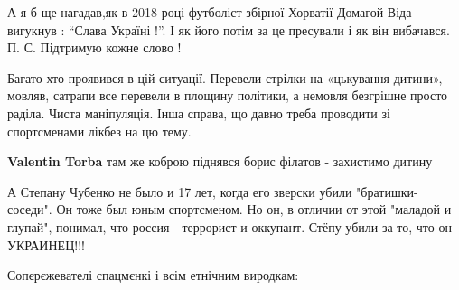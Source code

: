 \begin{itemize}
 

А я б ще нагадав,як в 2018 році футболіст збірної Хорватії Домагой Віда
вигукнув : \enquote{Слава Україні !}. І як його потім за це пресували і як він
вибачався. П. С. Підтримую кожне слово !


 

Багато хто проявився в цій ситуації. Перевели стрілки на «цькування дитини»,
мовляв, сатрапи все перевели в площину політики, а немовля безгрішне просто
раділа. Чиста маніпуляція. Інша справа, що давно треба проводити зі
спортсменами лікбез на цю тему.

\begin{itemize}
 
\textbf{Valentin Torba} там же коброю піднявся борис філатов - захистимо дитину
\end{itemize}

 

А Степану Чубенко не было и 17 лет, когда его зверски убили "братишки-соседи".
Он тоже был юным спортсменом. Но он, в отличии от этой "маладой и глупай",
понимал, что россия - террорист и оккупант. Стёпу убили за то, что он
УКРАИНЕЦ!!!


 

Сопєрєжевателі спацмєнкі і всім етнічним виродкам:


\end{itemize}
